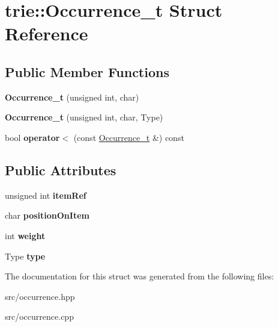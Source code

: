 \hypertarget{structtrie_1_1Occurrence__t}{}\section{trie\+:\+:Occurrence\+\_\+t Struct Reference}
\label{structtrie_1_1Occurrence__t}
\subsection*{Public Member Functions}
\begin{DoxyCompactItemize}
\item 
{\bfseries Occurrence\+\_\+t} (unsigned int, char)\hypertarget{structtrie_1_1Occurrence__t_a29ea384004224301476367000f06c816}{}\label{structtrie_1_1Occurrence__t_a29ea384004224301476367000f06c816}

\item 
{\bfseries Occurrence\+\_\+t} (unsigned int, char, Type)\hypertarget{structtrie_1_1Occurrence__t_a63b33fa23c261f3597880450f3925d94}{}\label{structtrie_1_1Occurrence__t_a63b33fa23c261f3597880450f3925d94}

\item 
bool {\bfseries operator$<$} (const \hyperlink{structtrie_1_1Occurrence__t}{Occurrence\+\_\+t} \&) const \hypertarget{structtrie_1_1Occurrence__t_a5cc0e97b16d080695ef9e1a7ef28c0b5}{}\label{structtrie_1_1Occurrence__t_a5cc0e97b16d080695ef9e1a7ef28c0b5}

\end{DoxyCompactItemize}
\subsection*{Public Attributes}
\begin{DoxyCompactItemize}
\item 
unsigned int {\bfseries item\+Ref}\hypertarget{structtrie_1_1Occurrence__t_a43960f97cafebe64c26c982c08cfba07}{}\label{structtrie_1_1Occurrence__t_a43960f97cafebe64c26c982c08cfba07}

\item 
char {\bfseries position\+On\+Item}\hypertarget{structtrie_1_1Occurrence__t_ad437b9d4a0706be3198be71758f82be0}{}\label{structtrie_1_1Occurrence__t_ad437b9d4a0706be3198be71758f82be0}

\item 
int {\bfseries weight}\hypertarget{structtrie_1_1Occurrence__t_a6965ab9a75e4890037aeaa352700ba30}{}\label{structtrie_1_1Occurrence__t_a6965ab9a75e4890037aeaa352700ba30}

\item 
Type {\bfseries type}\hypertarget{structtrie_1_1Occurrence__t_a5f621787f85ec4a976004b5321eac41c}{}\label{structtrie_1_1Occurrence__t_a5f621787f85ec4a976004b5321eac41c}

\end{DoxyCompactItemize}


The documentation for this struct was generated from the following files\+:\begin{DoxyCompactItemize}
\item 
src/occurrence.\+hpp\item 
src/occurrence.\+cpp\end{DoxyCompactItemize}
